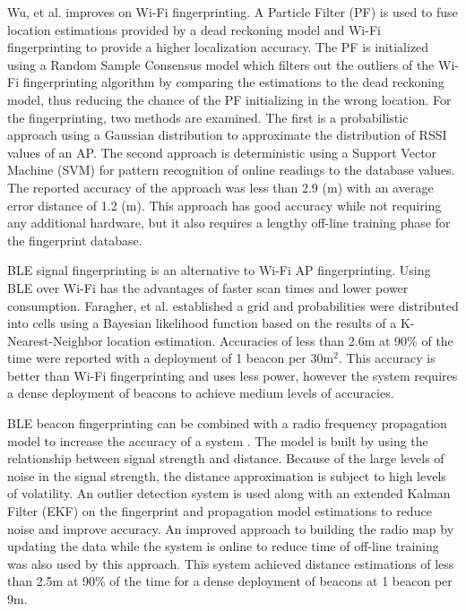 \documentclass[conference]{IEEEtran}
\begin{document}
Wu, et al. \cite{wu2016improved} improves on  Wi-Fi fingerprinting. A Particle Filter (PF) is used to fuse location estimations provided by a dead reckoning model and Wi-Fi fingerprinting to provide a higher localization accuracy. The PF is initialized using a Random Sample Consensus model which filters out the outliers of the Wi-Fi fingerprinting algorithm by comparing the estimations to the dead reckoning model, thus reducing the chance of the PF initializing in the wrong location. For the fingerprinting, two methods are examined. The first is a probabilistic approach using a Gaussian distribution to approximate the distribution of RSSI values of an AP. The second approach is deterministic using a Support Vector Machine (SVM) for pattern recognition of online readings to the database values.  The reported accuracy of the approach was less than 2.9 (m) with an average error distance of 1.2 (m). This approach has good accuracy while not requiring any additional hardware, but it also requires a lengthy off-line training phase for the fingerprint database.

BLE signal fingerprinting is an alternative to Wi-Fi AP fingerprinting. Using BLE over Wi-Fi has the advantages of faster scan times and lower power consumption. Faragher, et al. \cite{faragher2015location} established a grid and probabilities were distributed into cells using a Bayesian likelihood function based on the results of a K-Nearest-Neighbor location estimation. Accuracies of less than 2.6m at 90\% of the time were reported with a deployment of 1 beacon per 30m$^2$. This accuracy is better than Wi-Fi fingerprinting and uses less power, however the  system  requires a dense deployment of beacons to achieve medium levels of accuracies.

BLE beacon fingerprinting can be combined with a radio frequency propagation model to increase the accuracy of a system \cite{zhuang2016smartphone}. The model is built by using the relationship between signal strength and distance. Because of the large levels of noise in the signal strength, the distance approximation is subject to high levels of volatility.  An outlier detection system is used along with an extended Kalman Filter (EKF) on the fingerprint and propagation model estimations to reduce noise and improve accuracy. An improved approach to building the radio map by updating the data while the system is online to reduce time of off-line training was also used by this approach. This system achieved distance estimations of less than 2.5m at 90\% of the time for a dense deployment of beacons at 1 beacon per 9m.
\end{document}
